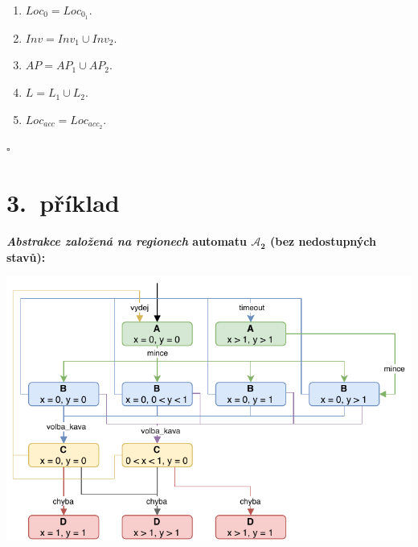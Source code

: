 \documentclass[a4paper, 11pt]{scrartcl}
\newcommand*{\QEDB}{\hfill\ensuremath{\square}}
\begin{document}
\begin{addmargin}[10pt]{0pt}
\begin{enumerate}
                \item
                    $ Loc_0 = Loc_{0_1} $.

                \item
                    $ Inv = Inv_1 \cup Inv_2 $.

                \item
                    $ AP = AP_1 \cup AP_2 $.

                \item
                    $ L = L_1 \cup L_2 $.

                \item
                    $ Loc_{acc} = Loc_{acc_2} $.
            \end{enumerate}
    \end{addmargin}
    \QEDB


    \section*{3.~příklad}

    \textbf{\emph{Abstrakce založená na regionech} automatu $ \boldsymbol{
    \mathcal{A}_2} $ (bez nedostupných stavů):}
    \begin{center}
        \includegraphics[width=.8 \linewidth]{img/region-abstraction.pdf}
    \end{center}
\end{document}
